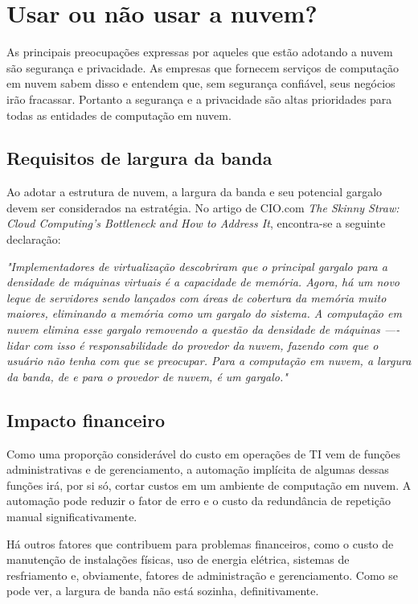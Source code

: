 \section{Usar ou não usar a nuvem?}

As principais preocupações expressas por aqueles que estão adotando a nuvem são
segurança e privacidade. As empresas que fornecem serviços de computação em nuvem
sabem disso e entendem que, sem segurança confiável, seus negócios irão
fracassar. Portanto a segurança e a privacidade são altas prioridades para todas as
entidades de computação em nuvem.


\subsection{Requisitos de largura da banda}

Ao adotar a estrutura de nuvem, a largura da banda e seu potencial gargalo devem ser
considerados na estratégia. No artigo de CIO.com \emph{The Skinny Straw: Cloud
Computing's Bottleneck and How to Address It}, encontra-se a seguinte declaração:

\begin{displayquote}
\emph{
    "Implementadores de virtualização descobriram que o principal gargalo para a 
    densidade de máquinas virtuais é a capacidade de memória. Agora, há um novo
    leque de servidores sendo lançados com áreas de cobertura da memória muito
    maiores, eliminando a memória como um gargalo do sistema. A computação em nuvem
    elimina esse gargalo removendo a questão da densidade de máquinas —- lidar com
    isso é responsabilidade do provedor da nuvem, fazendo com que o usuário não tenha
    com que se preocupar.
    Para a computação em nuvem, a largura da banda, de e para o provedor de nuvem,
    é um gargalo."
}
\end{displayquote}


\subsection{Impacto financeiro}

Como uma proporção considerável do custo em operações de TI vem de funções
administrativas e de gerenciamento, a automação implícita de algumas dessas
funções irá, por si só, cortar custos em um ambiente de computação em nuvem.
A automação pode reduzir o fator de erro e o custo da redundância de repetição
manual significativamente. 

Há outros fatores que contribuem para problemas financeiros, como o custo de
manutenção de instalações físicas, uso de energia elétrica, sistemas de
resfriamento e, obviamente, fatores de administração e gerenciamento. Como se
pode ver, a largura de banda não está sozinha, definitivamente.
